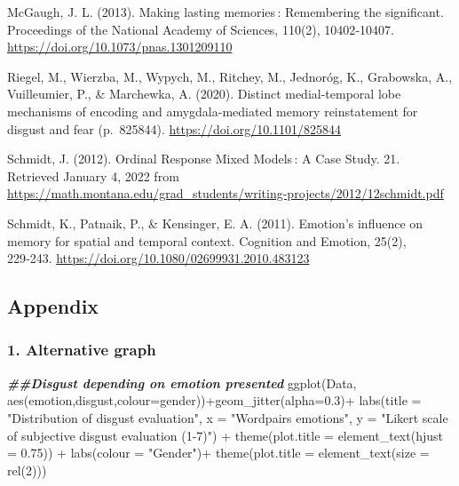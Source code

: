 \documentclass[
]{article}
\newenvironment{Shaded}{\begin{snugshade}}{\end{snugshade}}
\newcommand{\AttributeTok}[1]{\textcolor[rgb]{0.77,0.63,0.00}{#1}}
\newcommand{\DecValTok}[1]{\textcolor[rgb]{0.00,0.00,0.81}{#1}}
\newcommand{\DocumentationTok}[1]{\textcolor[rgb]{0.56,0.35,0.01}{\textbf{\textit{#1}}}}
\newcommand{\FloatTok}[1]{\textcolor[rgb]{0.00,0.00,0.81}{#1}}
\newcommand{\FunctionTok}[1]{\textcolor[rgb]{0.00,0.00,0.00}{#1}}
\newcommand{\NormalTok}[1]{#1}
\newcommand{\SpecialCharTok}[1]{\textcolor[rgb]{0.00,0.00,0.00}{#1}}
\newcommand{\StringTok}[1]{\textcolor[rgb]{0.31,0.60,0.02}{#1}}
\begin{document}
McGaugh, J. L. (2013). Making lasting memories\,: Remembering the
significant. Proceedings of the National Academy of Sciences, 110(2),
10402‑10407. \url{https://doi.org/10.1073/pnas.1301209110}

Riegel, M., Wierzba, M., Wypych, M., Ritchey, M., Jednoróg, K.,
Grabowska, A., Vuilleumier, P., \& Marchewka, A. (2020). Distinct
medial-temporal lobe mechanisms of encoding and amygdala-mediated memory
reinstatement for disgust and fear (p.~825844).
\url{https://doi.org/10.1101/825844}

Schmidt, J. (2012). Ordinal Response Mixed Models\,: A Case Study. 21.
Retrieved January 4, 2022 from
\url{https://math.montana.edu/grad_students/writing-projects/2012/12schmidt.pdf}

Schmidt, K., Patnaik, P., \& Kensinger, E. A. (2011). Emotion's
influence on memory for spatial and temporal context. Cognition and
Emotion, 25(2), 229‑243.
\url{https://doi.org/10.1080/02699931.2010.483123}

\hypertarget{appendix}{%
\subsection{Appendix}\label{appendix}}

\hypertarget{alternative-graph}{%
\subsubsection{1. Alternative graph}\label{alternative-graph}}

\begin{Shaded}
\begin{Highlighting}[]
\DocumentationTok{\#\#Disgust depending on emotion presented}
\FunctionTok{ggplot}\NormalTok{(Data, }\FunctionTok{aes}\NormalTok{(emotion,disgust,}\AttributeTok{colour=}\NormalTok{gender))}\SpecialCharTok{+}\FunctionTok{geom\_jitter}\NormalTok{(}\AttributeTok{alpha=}\FloatTok{0.3}\NormalTok{)}\SpecialCharTok{+}
  \FunctionTok{labs}\NormalTok{(}\AttributeTok{title =} \StringTok{"Distribution of disgust evaluation"}\NormalTok{, }\AttributeTok{x =} \StringTok{"Wordpairs\textquotesingle{} emotions"}\NormalTok{, }\AttributeTok{y =} \StringTok{"Likert scale of subjective disgust evaluation (1{-}7)"}\NormalTok{) }\SpecialCharTok{+} \FunctionTok{theme}\NormalTok{(}\AttributeTok{plot.title =} \FunctionTok{element\_text}\NormalTok{(}\AttributeTok{hjust =} \FloatTok{0.75}\NormalTok{)) }\SpecialCharTok{+} \FunctionTok{labs}\NormalTok{(}\AttributeTok{colour =} \StringTok{"Gender"}\NormalTok{)}\SpecialCharTok{+} \FunctionTok{theme}\NormalTok{(}\AttributeTok{plot.title =} \FunctionTok{element\_text}\NormalTok{(}\AttributeTok{size =} \FunctionTok{rel}\NormalTok{(}\DecValTok{2}\NormalTok{)))}
\end{Highlighting}
\end{Shaded}
\end{document}
